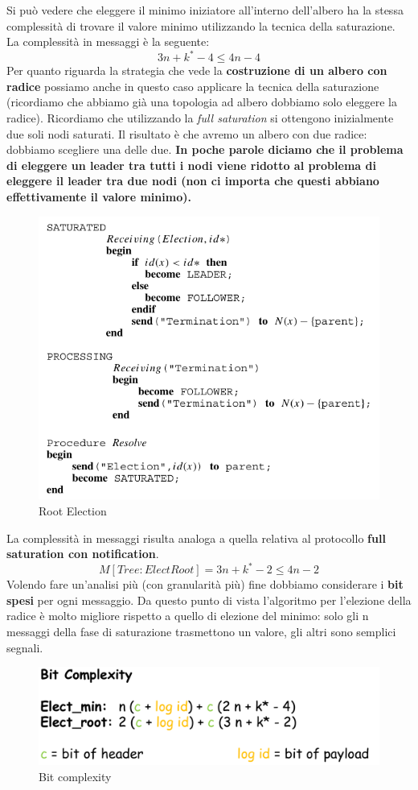 \documentclass[12pt]{article}
\begin{document}
			Si può vedere che eleggere il minimo iniziatore all'interno dell'albero ha la stessa complessità di trovare il valore minimo utilizzando la tecnica della saturazione. La complessità in messaggi è la seguente: 
			$$3n+k^*-4 \leq 4n-4 $$ 
			Per quanto riguarda la strategia che vede la \textbf{costruzione di un albero con radice } possiamo anche in questo caso applicare la tecnica della saturazione (ricordiamo che abbiamo già una topologia ad albero dobbiamo solo eleggere la radice). Ricordiamo che utilizzando la \textit{full saturation} si ottengono inizialmente due soli nodi saturati. Il risultato è che avremo un albero con due radice: dobbiamo scegliere una delle due. \textbf{In poche parole diciamo che il problema di eleggere un leader tra tutti i nodi viene ridotto al problema di eleggere il leader tra due nodi (non ci importa che questi abbiano effettivamente il valore  minimo).}\\
			\begin{figure}[h!]
				\centering
				\includegraphics[scale=0.40]{img/elec.png}
				\caption{Root Election}
			\end{figure}
			La complessità in messaggi risulta analoga a quella relativa al protocollo \textbf{full saturation con notification}.
			$$M[Tree:ElectRoot] = 3n+k^*-2 \leq 4n-2$$ 
			Volendo fare un'analisi più (con granularità più) fine dobbiamo considerare i \textbf{bit spesi }per ogni messaggio. Da questo punto di vista l'algoritmo per l'elezione della radice è molto migliore rispetto a quello di elezione del minimo: solo gli n messaggi della fase di saturazione trasmettono un valore, gli altri sono semplici segnali.  
			\begin{figure}[h!]
				\centering
				\includegraphics[scale=0.3]{img/bitcom.png}
				\caption{Bit complexity}
			\end{figure}  
\end{document}
